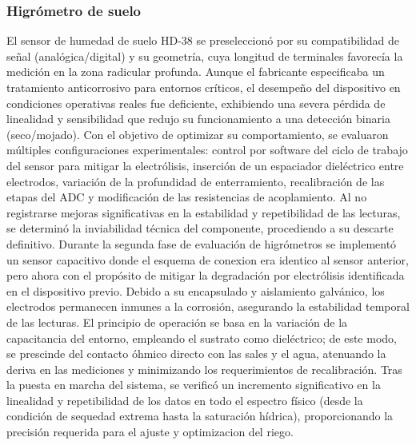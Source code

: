 \subsubsection{Higrómetro de suelo}
El sensor de humedad de suelo HD-38 se preseleccionó por su compatibilidad de señal (analógica/digital) y su geometría, cuya longitud de terminales favorecía la medición en la zona radicular profunda. Aunque el fabricante especificaba un tratamiento anticorrosivo para entornos críticos, el desempeño del dispositivo en condiciones operativas reales fue deficiente, exhibiendo una severa pérdida de linealidad y sensibilidad que redujo su funcionamiento a una detección binaria (seco/mojado). Con el objetivo de optimizar su comportamiento, se evaluaron múltiples configuraciones experimentales: control por software del ciclo de trabajo del sensor para mitigar la electrólisis, inserción de un espaciador dieléctrico entre electrodos, variación de la profundidad de enterramiento, recalibración de las etapas del ADC y modificación de las resistencias de acoplamiento. Al no registrarse mejoras significativas en la estabilidad y repetibilidad de las lecturas, se determinó la inviabilidad técnica del componente, procediendo a su descarte definitivo.
Durante la segunda fase de evaluación de higrómetros se implementó un sensor capacitivo donde el esquema de conexion era identico al sensor anterior, pero ahora con el propósito de mitigar la degradación por electrólisis identificada en el dispositivo previo. Debido a su encapsulado y aislamiento galvánico, los electrodos permanecen inmunes a la corrosión, asegurando la estabilidad temporal de las lecturas. El principio de operación se basa en la variación de la capacitancia del entorno, empleando el sustrato como dieléctrico; de este modo, se prescinde del contacto óhmico directo con las sales y el agua, atenuando la deriva en las mediciones y minimizando los requerimientos de recalibración. Tras la puesta en marcha del sistema, se verificó un incremento significativo en la linealidad y repetibilidad de los datos en todo el espectro físico (desde la condición de sequedad extrema hasta la saturación hídrica), proporcionando la precisión requerida para el ajuste y optimizacion del riego.

